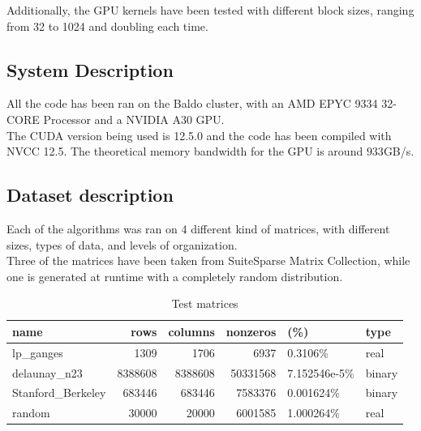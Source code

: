 \documentclass[conference]{IEEEtran}
\begin{document}
Additionally, the GPU kernels have been tested with different block sizes, ranging from 32 to 1024 and doubling each time.

\subsection{System Description}

All the code has been ran on the Baldo cluster, with an AMD EPYC 9334 32-CORE Processor and a NVIDIA A30 GPU.\\
The CUDA version being used is 12.5.0 and the code has been compiled with NVCC 12.5.
The theoretical memory bandwidth for the GPU is around $933$GB/s.

\subsection{Dataset description}
Each of the algorithms was ran on 4 different kind of matrices, with different sizes, types of data, and levels of organization.\\
Three of the matrices have been taken from SuiteSparse Matrix Collection, while one is generated at runtime with a completely random distribution.
\begin{table}[ht!]
    \centering
    \begin{adjustbox}{width=\columnwidth}
        \begin{tabular}{l|r|r|rl|l}
            name & rows & columns & nonzeros & (\%) & type \\
            \hline
            lp\_ganges\footnote & 1309 & 1706 & 6937 & 0.3106\% & real \\
            delaunay\_n23\footnotemark & 8388608 & 8388608 & 50331568 & 7.152546e-5\% & binary \\
            Stanford\_Berkeley\footnotemark & 683446 & 683446 & 7583376 & 0.001624\% & binary \\
            random & 30000 & 20000 & 6001585 & 1.000264\% & real \\
        \end{tabular}
    \end{adjustbox}
    \caption{Test matrices}
    \label{tab:matrices}
\end{table}
\end{document}
